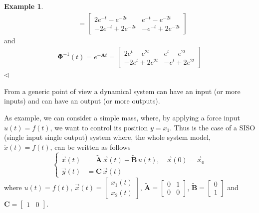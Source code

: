\documentclass[11pt,a4paper,oneside]{book}
\numberwithin{equation}{section}
\theoremstyle{it}
\theoremstyle{definition}
\newtheorem{example}{Example}[chapter]
\begin{document}
\begin{example}
\begin{equation}
\begin{aligned}
			&= \left[ \begin{matrix}
				2e^{-t}-e^{-2t} & e^{-t}-e^{-2t}\\[8pt]
				-2e^{-t}+2e^{-2t} & -e^{-t}+2e^{-2t}
			\end{matrix}\right]
		\end{aligned}
	\end{equation}
	and
	\begin{equation}
		\begin{aligned}
			\mathbf{\Phi}^{-1}(t) = e^{-\tilde{\mathbf{A}}t} = \left[ \begin{matrix}
				2e^{t}-e^{2t} & e^{t}-e^{2t}\\[8pt]
				-2e^{t}+2e^{2t} & -e^{t}+2e^{2t}
			\end{matrix}\right]
		\end{aligned}
	\end{equation}
$\triangleleft$ 
\end{example}

From a generic point of view a dynamical system can have an input (or more 
inputs) and can  have an output (or more outputs).

As example, we can consider a simple mass, where, by applying a force input $u(t)=f(t)$, we want to control its position $y=x_1$. Thus is the case of a SISO (single input single output) system   where, the whole system model, $\ddot{x}(t)=f(t)$, can be written as follows
\begin{equation}\label{ss_solution_eq11}
	\left\lbrace \begin{aligned}
		\dot{\vec{x}}(t)  &= \tilde{\mathbf{A}} \,\vec{x}(t) +\tilde{\mathbf{B}} \,u(t), \quad\vec{x}(0)=\vec{x}_0 \\[6pt]
		\vec{y}(t)  &= {\mathbf{C}} \,\vec{x}(t)
	\end{aligned}\right. 
\end{equation}
where $u(t)=f(t)$, $\vec{x}(t)=\begin{bmatrix} x_1(t)\\x_2(t) 
\end{bmatrix}$, $\tilde{\mathbf{A}}=\begin{bmatrix} 0&1\\0&0 
\end{bmatrix}$, 
$\tilde{\mathbf{B}}=\begin{bmatrix} 0\\1 \end{bmatrix}$ and 
${\mathbf{C}}=\begin{bmatrix} 1&0 \end{bmatrix}$.
\end{document}
